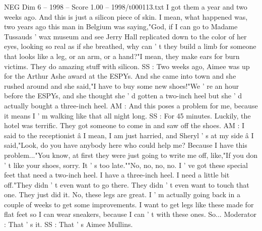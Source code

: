 \begin{textsample}{NEG Dim 6 – 1998 – Score 1.00 – 1998/t000113.txt}
I got them a year and two weeks ago.
And this is just a silicon piece of skin.
I mean, what happened was, two years ago this man in Belgium was saying,"God, if I can go to Madame Tussauds ' wax museum and see Jerry Hall replicated down to the color of her eyes, looking so real as if she breathed, why can ' t they build a limb for someone that looks like a leg, or an arm, or a hand?"I mean, they make ears for burn victims.
They do amazing stuff with silicon.
SS : Two weeks ago, Aimee was up for the Arthur Ashe award at the ESPYs.
And she came into town and she rushed around and she said,"I have to buy some new shoes!"We ' re an hour before the ESPYs, and she thought she ' d gotten a two-inch heel but she ' d actually bought a three-inch heel.
AM : And this poses a problem for me, because it means I ' m walking like that all night long.
SS : For 45 minutes.
Luckily, the hotel was terrific.
They got someone to come in and saw off the shoes.
AM : I said to the receptionist â I mean, I am just harried, and Sheryl ' s at my side â I said,"Look, do you have anybody here who could help me?
Because I have this problem..."You know, at first they were just going to write me off, like,"If you don ' t like your shoes, sorry.
It ' s too late.""No, no, no, no.
I ' ve got these special feet that need a two-inch heel.
I have a three-inch heel.
I need a little bit off."They didn ' t even want to go there.
They didn ' t even want to touch that one.
They just did it.
No, these legs are great.
I ' m actually going back in a couple of weeks to get some improvements.
I want to get legs like these made for flat feet so I can wear sneakers, because I can ' t with these ones.
So...
Moderator : That ' s it.
SS : That ' s Aimee Mullins.

\end{textsample}

